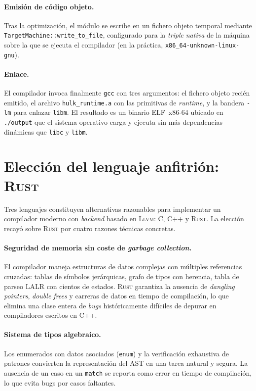 \documentclass[11pt,a4paper,oneside,openany]{report}
\newcommand{\code}[1]{\texttt{#1}}
\newcommand{\rust}{\textsc{Rust}}
\newcommand{\llvm}{\textsc{Llvm}}
\begin{document}
\paragraph{Emisión de código objeto.} Tras la optimización, el módulo se
escribe en un fichero objeto temporal mediante
\code{TargetMachine::write\_to\_file}, configurado para la \textit{triple}
\textit{nativa} de la máquina sobre la que se ejecuta el compilador (en la
práctica, \code{x86\_64-unknown-linux-gnu}).

\paragraph{Enlace.} El compilador invoca finalmente \code{gcc} con tres
argumentos: el fichero objeto recién emitido, el archivo \code{hulk\_runtime.a}
con las primitivas de \textit{runtime}, y la bandera \code{-lm} para enlazar
\code{libm}. El resultado es un binario ELF~x86-64 ubicado en \code{./output}
que el sistema operativo carga y ejecuta sin más dependencias dinámicas que
\code{libc} y \code{libm}.

\section{Elección del lenguaje anfitrión: \rust{}}

Tres lenguajes constituyen alternativas razonables para implementar un
compilador moderno con \textit{backend} basado en \llvm{}: C, C++ y \rust{}.
La elección recayó sobre \rust{} por cuatro razones técnicas concretas.

\paragraph{Seguridad de memoria sin coste de \textit{garbage collection}.}
El compilador maneja estructuras de datos complejas con múltiples referencias
cruzadas: tablas de símbolos jerárquicas, grafo de tipos con herencia, tabla de
parseo LALR con cientos de estados. \rust{} garantiza la ausencia de \textit{dangling
pointers}, \textit{double frees} y carreras de datos en tiempo de compilación, lo
que elimina una clase entera de \textit{bugs} históricamente difíciles de depurar
en compiladores escritos en C++.

\paragraph{Sistema de tipos algebraico.}
Los enumerados con datos asociados (\code{enum}) y la verificación exhaustiva de
patrones convierten la representación del AST en una tarea natural y segura. La
ausencia de un caso en un \code{match} se reporta como error en tiempo de
compilación, lo que evita bugs por casos faltantes.
\end{document}

